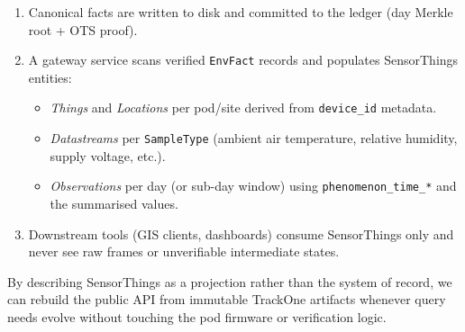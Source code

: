 \begin{enumerate}[nosep]
  \item Canonical facts are written to disk and committed to the ledger (day Merkle root + OTS proof).
  \item A gateway service scans verified \texttt{EnvFact} records and populates SensorThings entities:
        \begin{itemize}[nosep]
          \item \emph{Things} and \emph{Locations} per pod/site derived from \texttt{device\_id} metadata.
          \item \emph{Datastreams} per \texttt{SampleType} (ambient air temperature, relative humidity, supply voltage, etc.).
          \item \emph{Observations} per day (or sub-day window) using \texttt{phenomenon\_time\_*} and the summarised values.
        \end{itemize}
  \item Downstream tools (GIS clients, dashboards) consume SensorThings only and never see raw frames or unverifiable intermediate states.
\end{enumerate}

By describing SensorThings as a projection rather than the system of record, we can rebuild the public API from immutable TrackOne artifacts whenever query needs evolve without touching the pod firmware or verification logic.

